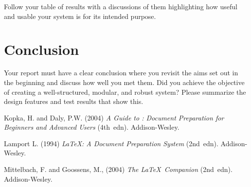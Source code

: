 \documentclass[11pt,a4paper]{article}
\begin{document}
Follow your table of results with a discussions of them highlighting
how useful and usable your system is for its intended purpose.

\section{Conclusion}
\label{ss:conclusion}

Your report must have a clear conclusion where you revisit the aims
set out in the beginning and discuss how well you met them. Did you
achieve the objective of creating a well-structured, modular, and
robust system?  Please summarize the design features and test results
that show this.

\begin{thebibliography}{9}

Kopka, H. and Daly, P.W.  (2004) \textit{A Guide to \LaTeXe:
Document Preparation for Beginners and Advanced Users} (4th~edn).
Addison-Wesley.

Lamport L. (1994) \textit{\LaTeX: A Document Preparation System}
(2nd~edn). Addison-Wesley.

Mittelbach, F. and Goossens, M., (2004) \textit{The \LaTeX\
Companion} (2nd~edn). Addison-Wesley.

\end{thebibliography}
\end{document}
